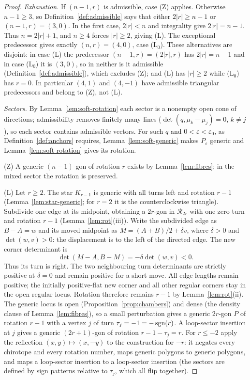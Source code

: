 \begin{proof}
\emph{Exhaustion.} If $(n-1,r)$ is admissible, case (Z) applies.
Otherwise $n-1\geq3$, so Definition~\ref{def:admissible} says that
either $2|r|\geq n-1$ or $(n-1,r)=(3,0)$. In the first case,
$2|r|<n$ and integrality give $2|r|=n-1$. Thus
$n=2|r|+1$, and $n\geq4$ forces $|r|\geq2$, giving (L).
The exceptional predecessor gives exactly $(n,r)=(4,0)$, case
(L$_0$). These alternatives are disjoint: in case (L) the predecessor
$(n-1,r)=(2|r|,r)$ has $2|r|=n-1$ and in case (L$_0$) it is $(3,0)$, so in
neither is it admissible (Definition~\ref{def:admissible}), which excludes
(Z); and (L) has $|r|\geq2$ while (L$_0$) has $r=0$. In particular $(4,1)$
and $(4,-1)$ have admissible triangular predecessors and belong
 to (Z), not (L).

\emph{Sectors.} By Lemma~\ref{lem:soft-rotation} each sector is a nonempty
open cone of directions; admissibility removes finitely many lines
($\det(q,\mu_k-\mu_j)=0$, $k\neq j$), so each sector contains admissible
vectors. For such $q$ and $0<\varepsilon<\varepsilon_0$, as Definition~\ref{def:anchors}
requires, Lemma~\ref{lem:soft-generic} makes $P_\varepsilon$ generic and
Lemma~\ref{lem:soft-rotation} gives its rotation.

(Z) A generic $(n-1)$-gon of rotation $r$ exists by Lemma~\ref{lem:fibres};
in the mixed sector the rotation is preserved.

(L) Let $r\geq2$. The star $K_{r-1}$ is generic with all turns left and
rotation $r-1$ (Lemma~\ref{lem:star-generic}; for $r=2$ it is the
counterclockwise triangle). Subdivide one edge at its midpoint, obtaining a
$2r$-gon in $\mathcal R_{2r}$ with one zero turn and rotation $r-1$
(Lemma~\ref{lem:rot}(iii)). Write the subdivided edge as $B-A=w$
and its moved midpoint as $M=(A+B)/2+\delta v$, where $\delta>0$
and $\det(w,v)>0$: the displacement is to the left of the directed edge.
The new corner determinant is
\begin{equation}\label{eq:anchor-midpoint-turn}
\det(M-A,B-M)=-\delta\det(w,v)<0.
\end{equation}
Thus its turn is right. The two neighbouring turn determinants are
strictly positive at $\delta=0$ and remain positive for a short move.
All edge lengths remain positive; the initially positive-flat new
corner and all other regular corners stay in the open regular locus.
Rotation therefore remains $r-1$ by Lemma~\ref{lem:rot}(ii). The
generic locus is open (Proposition~\ref{prop:chambers}) and dense (the
density clause of Lemma~\ref{lem:fibres}), so a
small perturbation gives a generic $2r$-gon $P$ of rotation $r-1$ with a
vertex $j$ of turn $\tau_j=-1=-\operatorname{sgn}(r)$. A loop-sector insertion at $j$ gives
a generic $(2r+1)$-gon of rotation $r-1-\tau_j=r$. For $r\leq-2$ apply the
reflection $(x,y)\mapsto(x,-y)$ to the construction for $-r$: it negates every
chirotope and every rotation number, maps generic polygons to generic
polygons, and maps a loop-sector insertion to a loop-sector insertion (the
sectors are defined by sign patterns relative to $\tau_j$, which all flip
together).


\end{proof}
